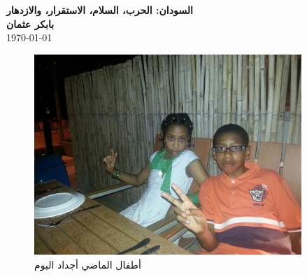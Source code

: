 \documentclass[12pt]{article}
\begin{document}
\begin{center}
    {\Huge\textbf{\textcolor{titleColor}{السودان: الحرب، السلام، الاستقرار، والازدهار}}} \\
    \vspace{0.5cm}
    \textbf{\textcolor{emphasisColor}{بابكر عثمان}} \\
    \vspace{0.2cm}
    \today
\end{center}

\begin{figure}
    \includegraphics[width=0.9\textwidth]{d9.jpg}
    \caption{\textcolor{sectionColor}{أطفال الماضي أجداد اليوم}}
\end{figure}
\end{document}

